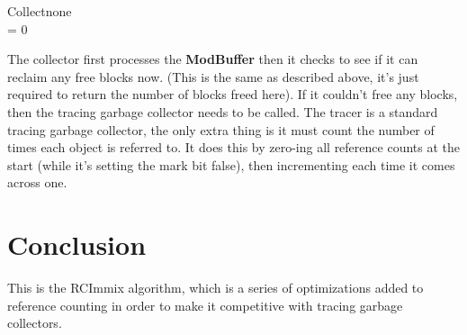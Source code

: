 \documentclass{article}
\begin{document}
\begin{pseudocode}{Collect}{none}
	\\
	\IF {} = 0 \THEN
\end{pseudocode}

The collector first processes the \textbf{ModBuffer} then it checks to see if it can reclaim any free blocks now. (This is the same  as described above, it's just required to return the number of blocks freed here). If it couldn't free any blocks, then the tracing garbage collector needs to be called. The tracer is a standard tracing garbage collector, the only extra thing is it must count the number of times each object is referred to. It does this by zero-ing all reference counts at the start (while it's setting the mark bit false), then incrementing each time it comes across one.

\section{Conclusion}

This is the RCImmix algorithm, which is a series of optimizations added to reference counting in order to make it competitive with tracing garbage collectors.




\end{document}
